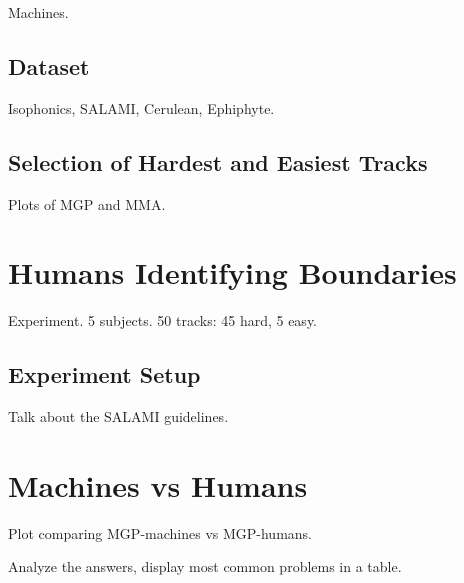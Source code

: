 \documentclass{article}
\begin{document}
Machines.

\subsection{Dataset}

Isophonics, SALAMI\cite{Smith2011}, Cerulean, Ephiphyte.

\subsection{Selection of Hardest and Easiest Tracks}

Plots of MGP and MMA.

\section{Humans Identifying Boundaries}\label{sec:using_method}

Experiment. 5 subjects. 50 tracks: 45 hard, 5 easy.

\subsection{Experiment Setup}

Talk about the SALAMI guidelines.

\section{Machines vs Humans}

Plot comparing MGP-machines vs MGP-humans.

Analyze the answers, display most common problems in a table.


\end{document}
